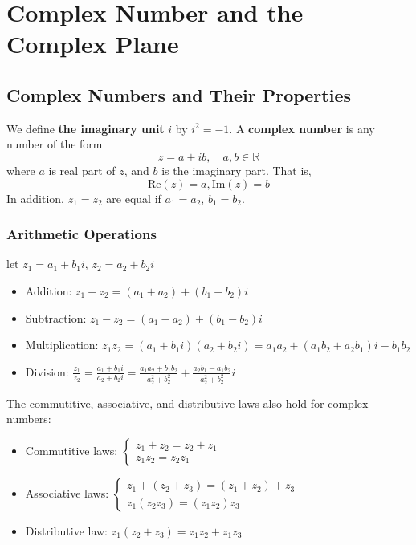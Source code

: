 \documentclass[11pt]{article}
\begin{document}
\pagestyle{plain}
\begin{center}
    \tableofcontents
\end{center}
\newpage
\setcounter{page}{1}
\pagestyle{fancy}
\section{Complex Number and the Complex Plane}
\subsection{Complex Numbers and Their Properties}
We define \textbf{the imaginary unit} $i$ by $i^2 = -1$. A \textbf{complex number} is any number of the form 
\[
    z = a + ib,\quad a, b\in\mathbb{R}
\]
where $a$ is real part of $z$, and $b$ is the imaginary part. That is,
\[
    \text{Re}(z) = a, \text{Im}(z) = b
\]
In addition, $z_1 = z_2$ are equal if $a_1 = a_2,\,b_1 = b_2$.
\subsubsection*{Arithmetic Operations}
let $z_1 = a_1 + b_1i,\,z_2 = a_2 + b_2i$
\begin{itemize}
    \item Addition: $z_1 + z_2 = (a_1+a_2)+ (b_1+b_2)i$
    \item Subtraction: $z_1 - z_2 = (a_1-a_2)+ (b_1-b_2)i$
    \item Multiplication: $z_1 z_2 = (a_1 + b_1i)(a_2 + b_2i) = a_1a_2 + (a_1b_2 + a_2b_1)i - b_1b_2$
    \item Division: $\displaystyle\frac{z_1}{z_2} = \frac{a_1 + b_1i}{a_2 + b_2i} = \frac{a_1a_2 + b_1b_2}{a_2^2+b_2^2} + \frac{a_2b_1-a_1b_2}{a_2^2+b_2^2}i$
\end{itemize}
The commutitive, associative, and distributive laws also hold for complex numbers:
\begin{itemize}
    \item Commutitive laws: $\begin{cases}z_1+z_2 = z_2+z_1\\ z_1z_2 = z_2z_1\end{cases}$
    \item Associative laws: $\begin{cases}z_1+(z_2+z_3) = (z_1+z_2)+z_3\\ z_1(z_2z_3) = (z_1z_2)z_3\end{cases}$
    \item Distributive law: $z_1(z_2+z_3) = z_1z_2 + z_1z_3$
\end{itemize}
\end{document}
